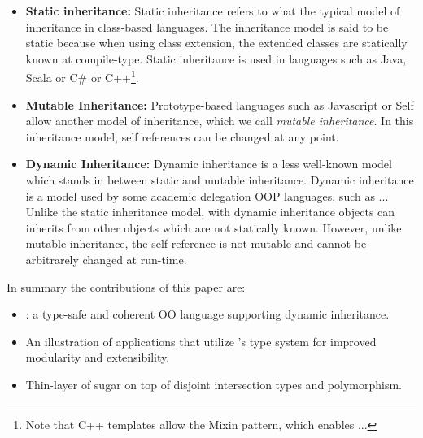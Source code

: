 \begin{itemize}



\item{{\bf Static inheritance:}} Static inheritance refers to what the
  typical model of inheritance in class-based languages. The
  inheritance model is said to be static because when using class
  extension, the extended classes are statically known at compile-type.
Static inheritance is used in languages such as Java, Scala or C\# or
C++\footnote{Note that C++ templates allow the Mixin pattern, which
  enables ...}.

\item{{\bf Mutable Inheritance:}} Prototype-based languages such as 
Javascript or Self allow another model of inheritance, which we call
\emph{mutable inheritance}. In this inheritance model, self references 
can be changed at any point. 

\item{{\bf Dynamic Inheritance:}} Dynamic inheritance is a less well-known 
model which stands in between static and mutable inheritance.
Dynamic inheritance is a model used by some academic delegation 
OOP languages, such as ...  
Unlike the static inheritance model, with dynamic inheritance 
objects can inherits from other objects which are not statically
known. However, unlike mutable inheritance, the self-reference is not 
mutable and cannot be arbitrarely changed at run-time. 

\end{itemize}

In summary the contributions of this paper are:

\begin{itemize}

\item \name: a type-safe and coherent OO language supporting dynamic
inheritance.

\item An illustration of applications that utilize \name's type system 
for improved modularity and extensibility.

\item Thin-layer of sugar on top of disjoint intersection types and
  polymorphism.

\end{itemize}